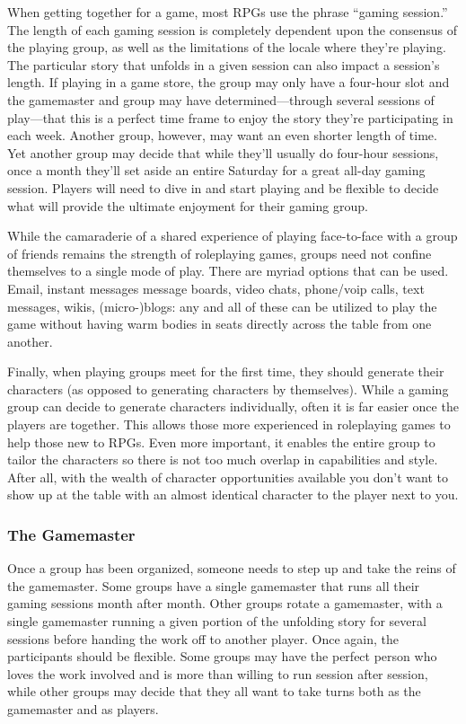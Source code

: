 When getting together for a game, most RPGs 
use the phrase ``gaming session.'' The length of each 
gaming session is completely dependent upon the consensus
of the playing group, as well as the limitations
of the locale where they're playing. The particular 
story that unfolds in a given session can also impact a 
session's length. If playing in a game store, the group 
may only have a four-hour slot and the gamemaster 
and group may have determined—through several sessions
of play—that this is a perfect time frame to enjoy
the story they're participating in each week. Another 
group, however, may want an even shorter length of 
time. Yet another group may decide that while they'll 
usually do four-hour sessions, once a month they'll 
set aside an entire Saturday for a great all-day gaming 
session. Players will need to dive in and start playing
and be flexible to decide what will provide the
ultimate enjoyment for their gaming group.

While the camaraderie of a shared experience of 
playing face-to-face with a group of friends remains 
the strength of roleplaying games, groups need not 
confine themselves to a single mode of play. There are 
myriad options that can be used. Email, instant messages
message boards, video chats, phone/voip calls,
text messages, wikis, (micro-)blogs: any and all of 
these can be utilized to play the game without having 
warm bodies in seats directly across the table from 
one another.

Finally, when playing groups meet for the first time, 
they should generate their characters (as opposed to 
generating characters by themselves). While a gaming 
group can decide to generate characters individually, 
often it is far easier once the players are together. This 
allows those more experienced in roleplaying games to 
help those new to RPGs. Even more important, it enables
the entire group to tailor the characters so there
is not too much overlap in capabilities and style. After 
all, with the wealth of character opportunities available
you don't want to show up at the table with an
almost identical character to the player next to you.

\subsubsection{The Gamemaster}

Once a group has been organized, someone needs to 
step up and take the reins of the gamemaster. Some 
groups have a single gamemaster that runs all their 
gaming sessions month after month. Other groups 
rotate a gamemaster, with a single gamemaster running
a given portion of the unfolding story for several
sessions before handing the work off to another
player. Once again, the participants should be flexible. 
Some groups may have the perfect person who loves 
the work involved and is more than willing to run 
session after session, while other groups may decide 
that they all want to take turns both as the gamemaster
and as players.

